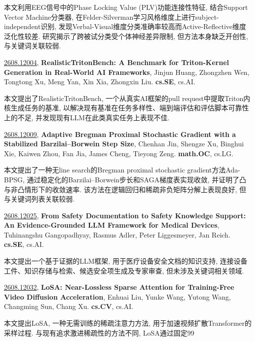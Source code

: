 \documentclass[9pt, a4paper]{article}
\theoremstyle{plain}
\theoremstyle{definition}
\theoremstyle{remark}
\newcommand{\arxivwithtarget}[3]{\hypertarget{#1}{}\href{https://arxiv.org/abs/#1}{#1}, \textbf{\textcolor{arxivblue}{#2}}, #3. }
\begin{document}
本文利用EEG信号中的Phase Locking Value (PLV)功能连接性特征, 结合Support Vector Machine分类器, 在Felder-Silverman学习风格维度上进行subject-independent识别, 发现Verbal-Visual维度分类准确率较高而Active-Reflective维度泛化性较差. 研究揭示了跨被试分类受个体神经差异限制, 但方法本身缺乏开创性, 与关键词关联较弱.


\arxivwithtarget{2608.12004}{RealisticTritonBench: A Benchmark for Triton-Kernel Generation in Real-World AI Frameworks}{Jinjun Huang, Zhongzhen Wen, Tongtong Xu, Meng Yan, Xin Xia, Zhongxin Liu}\textbf{cs.SE}, cs.AI.

本文提出了RealisticTritonBench, 一个从真实AI框架的pull request中提取Triton内核生成任务的基准, 以解决现有基准在任务多样性、端到端评估和评估脚本可靠性上的不足, 并发现现有LLM在此类真实任务上表现不佳.


\arxivwithtarget{2608.12009}{Adaptive Bregman Proximal Stochastic Gradient with a Stabilized Barzilai--Borwein Step Size}{Chenhan Jin, Shengze Xu, Binghui Xie, Kaiwen Zhou, Fan Jia, James Cheng, Tieyong Zeng}\textbf{math.OC}, cs.LG.

本文提出了一种无line search的Bregman proximal stochastic gradient方法Ada-BPSG, 通过稳定化的Barzilai--Borwein步长和SAGA梯度表实现收敛, 并证明了凸与非凸情形下的收敛速率. 该方法在逻辑回归和稀疏非负矩阵分解上表现良好, 但与关键词列表关联较弱.


\arxivwithtarget{2608.12025}{From Safety Documentation to Safety Knowledge Support: An Evidence-Grounded LLM Framework for Medical Devices}{Tuhinangshu Gangopadhyay, Rasmus Adler, Peter Liggesmeyer, Jan Reich}\textbf{cs.SE}, cs.AI.

本文提出一个基于证据的LLM框架, 用于医疗设备安全文档的知识支持, 连接设备工件、知识存储与检索、候选安全项生成及专家审查, 但未涉及关键词相关领域.


\arxivwithtarget{2608.12032}{LoSA: Near-Lossless Sparse Attention for Training-Free Video Diffusion Acceleration}{Enhuai Liu, Yunke Wang, Yutong Wang, Changming Sun, Chang Xu}\textbf{cs.CV}, cs.AI.

本文提出LoSA, 一种无需训练的稀疏注意力方法, 用于加速视频扩散Transformer的采样过程. 与现有追求激进稀疏性的方法不同, LoSA通过固定99%
\end{document}
